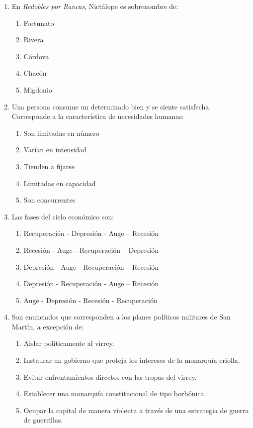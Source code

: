 \begin{enumerate}
	\item En \textit{Redobles por Rancas}, Nictálope es sobrenombre de:
	\begin{enumerate}[label=\alph*)]
		\item Fortunato
		\item Rivera
		\item Córdova
		\item Chacón
		\item Migdonio
	\end{enumerate}
	
	
		\item Una persona consume un determinado bien y se siente satisfecha. Corresponde a la característica de necesidades humanas:
	\begin{enumerate}[label=\alph*)]
		\item Son limitadas en número
		\item Varían en intensidad
		\item Tienden a fijarse
		\item Limitadas en capacidad
		\item Son concurrentes
	\end{enumerate}
	
	\item Las fases del ciclo económico son:
	\begin{enumerate}[label=\alph*)]
		\item Recuperación - Depresión - Auge – Recesión
		\item Recesión - Auge - Recuperación – Depresión
		\item Depresión - Auge - Recuperación – Recesión
		\item Depresión - Recuperación - Auge – Recesión
		\item Auge - Depresión - Recesión - Recuperación
	\end{enumerate}
	
	\item Son enunciados que corresponden a los planes políticos militares de San Martín, a excepción de:
	\begin{enumerate}[label=\alph*)]
		\item Aislar políticamente al virrey.
		\item Instaurar un gobierno que proteja los intereses de la monarquía criolla.
		\item Evitar enfrentamientos directos con las tropas del virrey.
		\item Establecer una monarquía constitucional de tipo borbónica.
		\item Ocupar la capital de manera violenta a través de una estrategia de guerra de guerrillas.
	\end{enumerate}
	

\end{enumerate}
